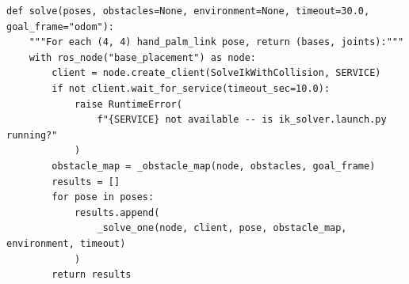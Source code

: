 \documentclass[11pt,a4paper]{book}
\begin{document}
\begin{lstlisting}[firstnumber=212]
def solve(poses, obstacles=None, environment=None, timeout=30.0, goal_frame="odom"):
    """For each (4, 4) hand_palm_link pose, return (bases, joints):"""
    with ros_node("base_placement") as node:
        client = node.create_client(SolveIkWithCollision, SERVICE)
        if not client.wait_for_service(timeout_sec=10.0):
            raise RuntimeError(
                f"{SERVICE} not available -- is ik_solver.launch.py running?"
            )
        obstacle_map = _obstacle_map(node, obstacles, goal_frame)
        results = []
        for pose in poses:
            results.append(
                _solve_one(node, client, pose, obstacle_map, environment, timeout)
            )
        return results


\end{lstlisting}
\end{document}
